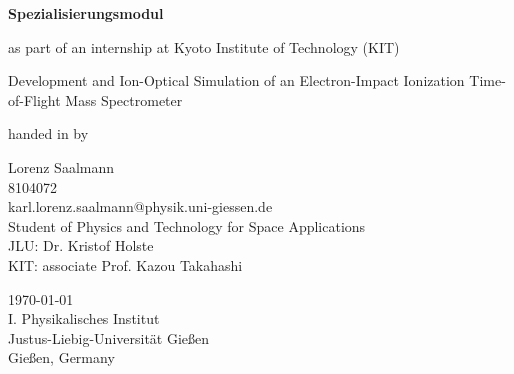 {%
\pagestyle{empty}
\sffamily

\vspace{1cm}
\vfill
{\bfseries \Large Spezialisierungsmodul}

{\Large as part of an internship at Kyoto Institute of Technology (KIT)}

\vspace{1cm}

{\Large Development and Ion-Optical Simulation of an
Electron-Impact Ionization Time-of-Flight Mass
Spectrometer}
\vfill

handed in by

{\Large Lorenz Saalmann}\\[1.0ex]
{\large {8104072}}\\[.2ex]
{karl.lorenz.saalmann@physik.uni-giessen.de}\\[2ex]
{\large {Student of Physics and Technology for Space Applications}}\\[.5ex]


{\large {JLU:    Dr. Kristof Holste}}\\[.5ex]
{\large {KIT:    associate Prof. Kazou Takahashi}}\\[.5ex]


\vfill



{\large {\today}}\\[.5ex]

{\large {I. Physikalisches Institut}}\\[.5ex]
{\large {Justus-Liebig-Universität Gießen}}\\[.5ex]
{\large {Gießen, Germany}}\\[.5ex]

\cleardoublepage
}%